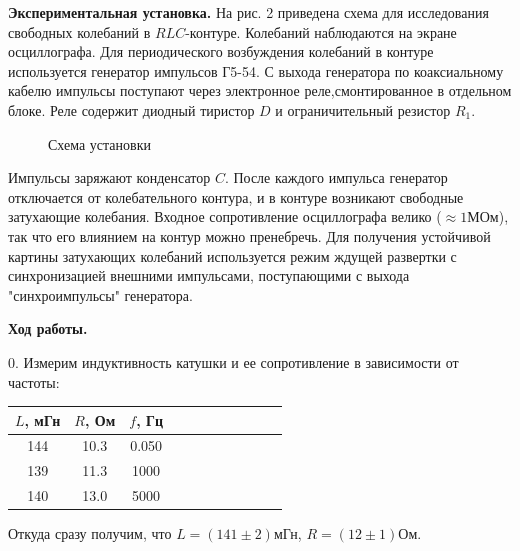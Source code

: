 \documentclass[14pt]{article}
\begin{document}
\textbf{Экспериментальная установка.} На рис. 2 приведена схема для исследования свободных колебаний в $RLC$-контуре. Колебаний наблюдаются на экране осциллографа. Для периодического возбуждения колебаний в контуре используется генератор импульсов Г5-54. С выхода генератора по коаксиальному кабелю импульсы поступают через электронное реле,смонтированное в отдельном блоке. Реле содержит диодный тиристор $D$ и ограничительный резистор $R_1$. 

\begin{figure}[h!]
	\caption{Схема установки}
	\label{fig:image}
\end{figure}

Импульсы заряжают конденсатор $C$. После каждого импульса генератор отключается от колебательного контура, и в контуре возникают свободные затухающие колебания. Входное сопротивление осциллографа велико ($\approx 1$МОм), так что его влиянием на контур можно пренебречь. Для получения устойчивой картины затухающих колебаний используется режим ждущей развертки с синхронизацией внешними импульсами, поступающими с выхода "синхроимпульсы" генератора. 

\vspace{1cm}
\textbf{Ход работы.}

0. Измерим индуктивность катушки и ее сопротивление в зависимости от частоты:

\begin{center}
\begin{tabular}{|c|c|c|c|c|c|c|c|c|c|c|}
\hline
$L$, мГн	&	$R$, Ом		&	$f$, Гц		\\
\hline
144			&	10.3		&	0.050		\\
\hline
139			&	11.3		&	1000		\\
\hline
140			&	13.0		&	5000		\\
\hline
\end{tabular}
\end{center}

Откуда сразу получим, что $L = (141 \pm 2)$мГн, $R = (12 \pm 1)$Ом.
\end{document}
